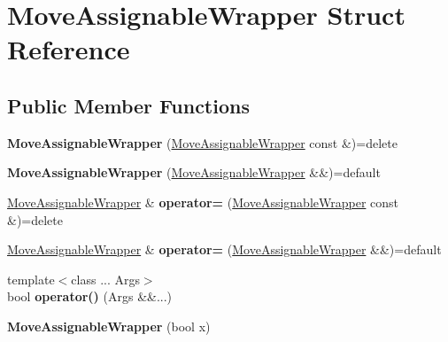 \hypertarget{struct_move_assignable_wrapper}{}\section{Move\+Assignable\+Wrapper Struct Reference}
\label{struct_move_assignable_wrapper}
\subsection*{Public Member Functions}
\begin{DoxyCompactItemize}
\item 
\mbox{\label{struct_move_assignable_wrapper_a35f325e515f8574bb4e5f62b3670d70a}} 
{\bfseries Move\+Assignable\+Wrapper} (\mbox{\hyperlink{struct_move_assignable_wrapper}{Move\+Assignable\+Wrapper}} const \&)=delete
\item 
\mbox{\label{struct_move_assignable_wrapper_afa180b175a4ddd725b2df96cd05308b8}} 
{\bfseries Move\+Assignable\+Wrapper} (\mbox{\hyperlink{struct_move_assignable_wrapper}{Move\+Assignable\+Wrapper}} \&\&)=default
\item 
\mbox{\label{struct_move_assignable_wrapper_aa4ad841d0e85842e146748a216c322bd}} 
\mbox{\hyperlink{struct_move_assignable_wrapper}{Move\+Assignable\+Wrapper}} \& {\bfseries operator=} (\mbox{\hyperlink{struct_move_assignable_wrapper}{Move\+Assignable\+Wrapper}} const \&)=delete
\item 
\mbox{\label{struct_move_assignable_wrapper_a820c69fcd3d59b24f24c67637fe313e0}} 
\mbox{\hyperlink{struct_move_assignable_wrapper}{Move\+Assignable\+Wrapper}} \& {\bfseries operator=} (\mbox{\hyperlink{struct_move_assignable_wrapper}{Move\+Assignable\+Wrapper}} \&\&)=default
\item 
\mbox{\label{struct_move_assignable_wrapper_a5845151782e0aa5b76db49d89282a5a0}} 
{\footnotesize template$<$class ... Args$>$ }\\bool {\bfseries operator()} (Args \&\&...)
\item 
\mbox{\label{struct_move_assignable_wrapper_ad59d5b26d07b399d985091999c9a5829}} 
{\bfseries Move\+Assignable\+Wrapper} (bool x)
\end{DoxyCompactItemize}
